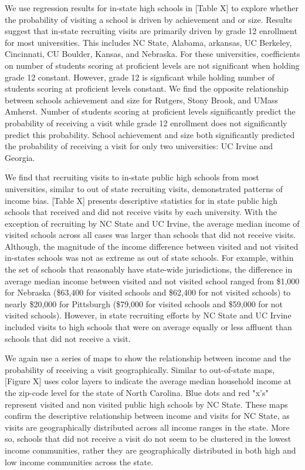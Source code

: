 \documentclass[twoside]{article}
\begin{document}
We use regression results for in-state high schools in [Table X] to explore whether the probability of visiting a school is driven by achievement and or size. Results suggest that in-state recruiting visits are primarily driven by grade 12 enrollment for most universities. This includes NC State, Alabama, arkansas, UC Berkeley, Cincinnati, CU Boulder, Kansas, and Nebraska. For these universities, coefficients on number of students scoring at proficient levels are not significant when holding grade 12 constant. However,  grade 12 is signficant while holding number of students scoring at proficient levels constant. We find the opposite relationship between schools achievement and size for Rutgers, Stony Brook, and UMass Amherst. Number of students scoring at proficient levels significantly predict the probability of receiving a visit while grade 12 enrollment does not significantly predict this probability. School achievement and size both significantly predicted the probability of receiving a visit for only two universities: UC Irvine and Georgia.

We find that recruiting visits to in-state public high schools from most universities, similar to out of state recruiting visits, demonstrated patterns of income bias. [Table X] presents descriptive statistics for in state public high schools that received and did not receive visits by each university.  With the exception of recruiting by NC State and UC Irvine, the average median income of visited schools across all cases was larger than schools that did not receive visits. Although, the magnitude of the income difference between visited and not visited in-states schools was not as extreme as out of state schools. For example, within the set of schools that reasonably have state-wide jurisdictions, the difference in average median income between visited and not visited school ranged from \$1,000 for Nebraska (\$63,400 for visited schools and \$62,400 for not visited schools) to nearly \$20,000 for Pittsburgh (\$79,000 for visited schools and \$59,000 for not visited schools). However, in state recruiting efforts by NC State and UC Irvine included visits to high schools that were on average equally or less affluent than schools that did not receive a visit.

We again use a series of maps to show the relationship between income and the probability of receiving a visit geographically. Similar to out-of-state maps, [Figure X] uses color layers to indicate the average median household income at the zip-code level for the state of North Carolina. Blue dots and red "x's" represent visited and non visited public high schools by NC State. These maps confirm the descriptive relationship between income and visits for NC State, as visits are geographically distributed across all income ranges in the state. More so, schools that did not receive a visit do not seem to be clustered in the lowest income communities, rather they are geographically distributed in both high and low income communities across the state. 
\end{document}
